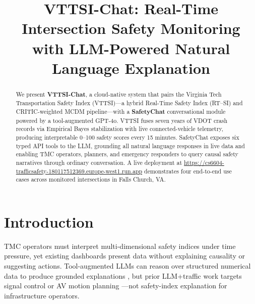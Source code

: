 \documentclass[conference]{IEEEtran}
\begin{document}
\title{VTTSI-Chat: Real-Time Intersection Safety Monitoring\\
with LLM-Powered Natural Language Explanation}

\author{
\and
{}
}

\maketitle

\sloppy
\raggedbottom

\begin{abstract}
We present \textbf{VTTSI-Chat}, a cloud-native system that pairs the Virginia Tech
Transportation Safety Index (VTTSI)---a hybrid Real-Time Safety Index (RT--SI) and
CRITIC-weighted MCDM pipeline---with a \textbf{SafetyChat} conversational module
powered by a tool-augmented GPT-4o.
VTTSI fuses seven years of VDOT crash records via Empirical Bayes stabilization with
live connected-vehicle telemetry, producing interpretable 0--100 safety scores every
15 minutes.
SafetyChat exposes six typed API tools to the LLM, grounding all natural language
responses in live data and enabling TMC operators, planners, and emergency responders
to query causal safety narratives through ordinary conversation.
A live deployment at
\url{https://cs6604-trafficsafety-180117512369.europe-west1.run.app}
demonstrates four end-to-end use cases across monitored intersections in Falls Church, VA.
\end{abstract}

\section{Introduction}
\label{sec:intro}

TMC operators must interpret multi-dimensional safety indices under time pressure, yet
existing dashboards present data without explaining causality or suggesting actions.
Tool-augmented LLMs can reason over structured numerical data to produce grounded
explanations \cite{toolformer2023}, but prior LLM+traffic work targets signal control
\cite{llmlight2024} or AV motion planning \cite{gptdriver2023,drivevlm2024}---not
safety-index explanation for infrastructure operators.
\end{document}
